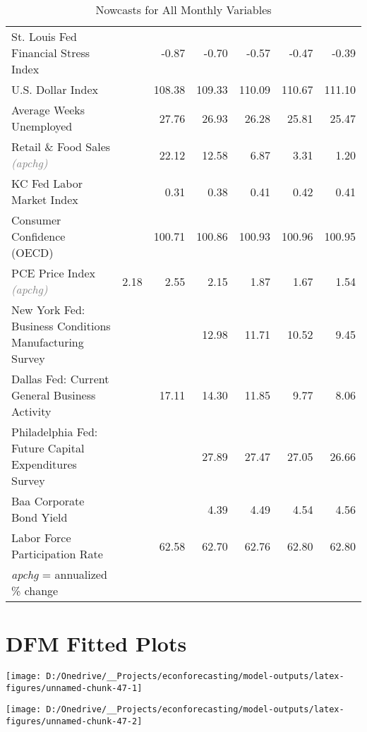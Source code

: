 \documentclass[11pt, letterpaper]{article}\usepackage[]{graphicx}\usepackage[]{color}
\begin{document}
\begin{table}[H]
\begin{tabular}{lrrrrrr}
  St. Louis Fed Financial Stress Index &  & -0.87 & -0.70 & -0.57 & -0.47 & -0.39 \\ 
  U.S. Dollar Index &  & 108.38 & 109.33 & 110.09 & 110.67 & 111.10 \\ 
  Average Weeks Unemployed &  & 27.76 & 26.93 & 26.28 & 25.81 & 25.47 \\ 
  Retail \& Food Sales \textit{\footnotesize\textcolor{gray}{(apchg)}} &  & 22.12 & 12.58 & 6.87 & 3.31 & 1.20 \\ 
  KC Fed Labor Market Index &  & 0.31 & 0.38 & 0.41 & 0.42 & 0.41 \\ 
  Consumer Confidence (OECD) &  & 100.71 & 100.86 & 100.93 & 100.96 & 100.95 \\ 
  PCE Price Index \textit{\footnotesize\textcolor{gray}{(apchg)}} & 2.18 & 2.55 & 2.15 & 1.87 & 1.67 & 1.54 \\ 
  New York Fed: Business Conditions Manufacturing Survey &  &  & 12.98 & 11.71 & 10.52 & 9.45 \\ 
  Dallas Fed: Current General Business Activity &  & 17.11 & 14.30 & 11.85 & 9.77 & 8.06 \\ 
  Philadelphia Fed: Future Capital Expenditures Survey &  &  & 27.89 & 27.47 & 27.05 & 26.66 \\ 
  Baa Corporate Bond Yield &  &  & 4.39 & 4.49 & 4.54 & 4.56 \\ 
  Labor Force Participation Rate &  & 62.58 & 62.70 & 62.76 & 62.80 & 62.80 \\ 
   \hline 
 \textit{apchg} = annualized \% change 
\end{tabular}
\endgroup
\caption{Nowcasts for All Monthly Variables} 
\end{table}



\appendix
\appendixpage
\addappheadtotoc

\section{DFM Fitted Plots}


{\centering \texttt{[image: D:/Onedrive/\_\_Projects/econforecasting/model-outputs/latex-figures/unnamed-chunk-47-1]} 

}




{\centering \texttt{[image: D:/Onedrive/\_\_Projects/econforecasting/model-outputs/latex-figures/unnamed-chunk-47-2]} 

}
\end{document}
